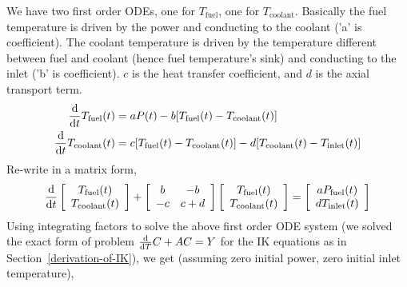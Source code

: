 \documentclass{school-22.211-notes}
\begin{document}
We have two first order ODEs, one for $T_{\mathrm{fuel}}$, one for $T_{\mathrm{coolant}}$. Basically the fuel temperature is driven by the power and conducting to the coolant ('a' is coefficient). The coolant temperature is driven by the temperature different between fuel and coolant (hence fuel temperature's sink) and conducting to the inlet ('b' is coefficient). $c$ is the heat transfer coefficient, and $d$ is the axial transport term. 
\begin{align}
\frac{\mathrm{d}}{\mathrm{d}t} T_{\mathrm{fuel}} (t) &= a P(t) - b [T_{\mathrm{fuel}}(t) - T_{\mathrm{coolant}}(t)] \\
\frac{\mathrm{d}}{\mathrm{d}t} T_{\mathrm{coolant}} (t) &= c [T_{\mathrm{fuel}}(t) - T_{\mathrm{coolant}} (t) ] - d [T_{\mathrm{coolant}} (t) - T_{\mathrm{inlet}} (t) ] 
\end{align}
Re-write in a matrix form, 
\begin{align}
\frac{\mathrm{d}}{\mathrm{d}t} \left[ \begin{array}{c} T_{\mathrm{fuel}}(t) \\ T_{\mathrm{coolant}} (t) \end{array} \right]
+ \left[ \begin{array}{cc} b & -b \\ -c & c+d \end{array} \right] 
\left[ \begin{array}{c} T_{\mathrm{fuel}} (t) \\ T_{\mathrm{coolant}} (t) \end{array} \right] 
= 
\left[ \begin{array}{c} a P_{\mathrm{fuel}}(t) \\ d T_{\mathrm{inlet}}(t) \end{array} \right]
\end{align}
Using integrating factors to solve the above first order ODE system (we solved the exact form of problem $\frac{\mathrm{d}}{\mathrm{d}T} C + A C = Y$ for the IK equations as in Section~\ref{derivation-of-IK}),  we get (assuming zero initial power, zero initial inlet temperature), 
\end{document}
